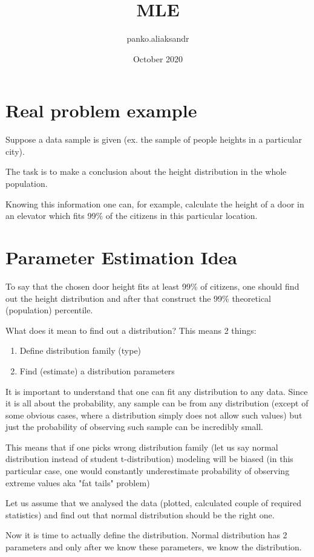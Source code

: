 \documentclass{article}
\title{MLE}
\author{panko.aliaksandr }
\date{October 2020}
\begin{document}
\maketitle

\section{Real problem example}
Suppose a data sample is given (ex. the sample of people heights in a particular city).

The task is to make a conclusion about the height distribution in the whole population.

Knowing this information one can, for example, calculate the height of a door in an elevator which fits 99\% of the citizens in this particular location.

\section{Parameter Estimation Idea}
To say that the chosen door height fits at least 99\% of citizens, one should find out the height distribution and after that construct the 99\% theoretical (population) percentile.

What does it mean to find out a distribution? This means 2 things:
\begin{enumerate}
    \item Define distribution family (type)
    \item Find (estimate) a distribution parameters
\end{enumerate}

It is important to understand that one can fit any distribution to any data. Since it is all about the probability, any sample can be from any distribution (except of some obvious cases, where a distribution simply does not allow such values) but just the probability of observing such sample can be incredibly small.

This means that if one picks wrong distribution family (let us say normal distribution instead of student t-distribution) modeling will be biased (in this particular case, one would constantly underestimate probability of observing extreme values aka "fat tails" problem)

Let us assume that we analysed the data (plotted, calculated couple of required statistics) and find out that normal distribution should be the right one.

Now it is time to actually define the distribution. Normal distribution has 2 parameters and only after we know these parameters, we know the distribution.
\end{document}
